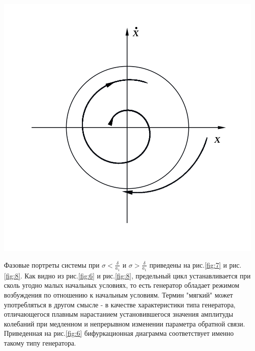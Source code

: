 \begin{center}
\begin{minipage}[t]{0.6\linewidth}
\begin{minipage}{0.45\linewidth}
                \label{fig:7}
            \end{minipage}
            \begin{minipage}{0.45\linewidth}
                \includegraphics[width=\linewidth]{photo/pics/Ris7b.png} 
                \label{fig:8}
            \end{minipage}
    \end{minipage}
\end{center}
  
Фазовые портреты системы при $\sigma<\frac{\delta}{a_1}$ и $\sigma>\frac{\delta}{a_1}$ приведены на рис.\ref{fig:7} и рис.\ref{fig:8}. Как видно из рис.\ref{fig:6} и рис.\ref{fig:8}, предельный цикл устанавливается при сколь угодно малых начальных условиях, то есть генератор обладает { режимом} возбуждения по 
отношению к начальным условиям. Термин "мягкий" может употребляться в другом смысле - в качестве характеристики типа генератора, отличающегося плавным нарастанием установившегося значения амплитуды колебаний при медленном и непрерывном изменении параметра обратной связи. Приведенная на рис.\ref{fig:6} 
бифуркационная диаграмма соответствует именно такому типу генератора.  

